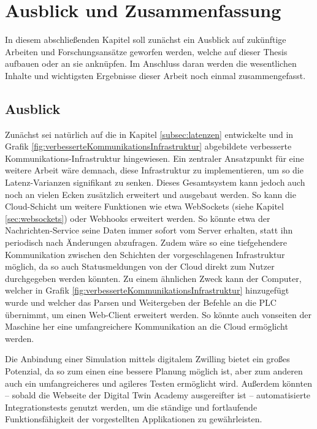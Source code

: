 \chapter{Ausblick und Zusammenfassung}
\label{cha:ausblick}

In diesem abschließenden Kapitel soll zunächst ein Ausblick auf zukünftige Arbeiten und Forschungsansätze geworfen werden, welche auf dieser Thesis aufbauen oder an sie anknüpfen. Im Anschluss daran werden die wesentlichen Inhalte und wichtigsten Ergebnisse dieser Arbeit noch einmal zusammengefasst.

\section{Ausblick}
\label{sec:ausblick}

Zunächst sei natürlich auf die in Kapitel \ref{subsec:latenzen} entwickelte und in Grafik \ref{fig:verbesserteKommunikationsInfrastruktur} abgebildete verbesserte Kommunikations-Infrastruktur hingewiesen. Ein zentraler Ansatzpunkt für eine weitere Arbeit wäre demnach, diese Infrastruktur zu implementieren, um so die Latenz-Varianzen signifikant zu senken. Dieses Gesamtsystem kann jedoch auch noch an vielen Ecken zusätzlich erweitert und ausgebaut werden. So kann die Cloud-Schicht um weitere Funktionen wie etwa WebSockets (siehe Kapitel \ref{sec:websockets}) oder Webhooks erweitert werden. So könnte etwa der Nachrichten-Service seine Daten immer sofort vom Server erhalten, statt ihn periodisch nach Änderungen abzufragen. Zudem wäre so eine tiefgehendere Kommunikation zwischen den Schichten der vorgeschlagenen Infrastruktur möglich, da so auch Statusmeldungen von der Cloud direkt zum Nutzer durchgegeben werden könnten. Zu einem ähnlichen Zweck kann der Computer, welcher in Grafik \ref{fig:verbesserteKommunikationsInfrastruktur} hinzugefügt wurde und welcher das Parsen und Weitergeben der Befehle an die PLC übernimmt, um einen Web-Client erweitert werden. So könnte auch vonseiten der Maschine her eine umfangreichere Kommunikation an die Cloud ermöglicht werden.

Die Anbindung einer Simulation mittels digitalem Zwilling bietet ein großes Potenzial, da so zum einen eine bessere Planung möglich ist, aber zum anderen auch ein umfangreicheres und agileres Testen ermöglicht wird. Außerdem könnten – sobald die Webseite der Digital Twin Academy ausgereifter ist –  automatisierte Integrationstests genutzt werden, um die ständige und fortlaufende Funktionsfähigkeit der vorgestellten Applikationen zu gewährleisten.

